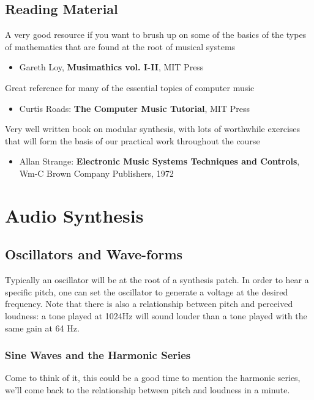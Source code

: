 \documentclass[11pt]{article}
\begin{document}
\subsection{Reading Material}
\label{sec:org0f0c4a5}

A very good resource if you want to brush up on some of the basics of the types of mathematics that are found at the root of musical systems
\begin{itemize}
\item Gareth Loy, \textbf{Musimathics vol. I-II}, MIT Press
\end{itemize}

Great reference for many of the essential topics of computer music
\begin{itemize}
\item Curtis Roads: \textbf{The Computer Music Tutorial}, MIT Press
\end{itemize}

Very well written book on modular synthesis, with lots of worthwhile exercises that will form the basis of our practical work throughout the course
\begin{itemize}
\item Allan Strange: \textbf{Electronic Music Systems Techniques and Controls}, Wm-C Brown Company Publishers, 1972
\end{itemize}

\section{Audio Synthesis}
\label{sec:org94d05d1}
\subsection{Oscillators and Wave-forms}
\label{sec:org731df00}
Typically an oscillator will be at the root of a synthesis patch. 
In order to hear a specific pitch, one can set the oscillator to 
generate a voltage at the desired frequency.  
Note that there is also a relationship between pitch and perceived 
loudness: a tone played at 1024Hz will sound louder than a tone played with the same gain at 64 Hz.

\subsubsection{Sine Waves and the Harmonic Series}
\label{sec:org89bd10b}
Come to think of it, this could be a good time to mention the harmonic
series, we'll come back to the relationship between pitch and loudness
in a minute. 
\end{document}
